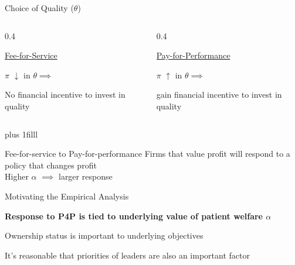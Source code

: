 \documentclass[notes,11pt, aspectratio=169]{beamer}
\newcommand{\btVFill}{\vskip0pt plus 1filll}
\newenvironment{wideitemize}{\itemize\addtolength{\itemsep}{10pt}}{\enditemize}
\begin{document}
\begin{frame}{Choice of Quality ($\theta$)}\label{choiceofquality}

\large
\vspace{5mm}

    \begin{columns}
    \begin{column}{0.4\textwidth}
    \begin{center}
        \underline{Fee-for-Service}

        \vspace{3mm}

            $\pi$ $\downarrow$ in $\theta \implies$

            \vspace{3mm}

            No financial incentive to invest in quality
    \end{center}
    \end{column}\pause
    \begin{column}{0.4\textwidth}  %
    \begin{center}
        \underline{Pay-for-Performance}

        \vspace{3mm}


            $\pi$ $\uparrow$ in $\theta \implies$

            \vspace{3mm}

            gain financial incentive to invest in quality
    \end{center}
    \end{column}
\end{columns}

\btVFill\pause

\begin{block}{\Large Fee-for-service to Pay-for-performance}
    \centering
    \vspace{1mm}
    Firms that value profit will respond to a policy that changes profit \\
    Higher $\alpha$ $\implies$ larger response

    \vspace{3mm}
\end{block}

\hyperlink{choiceofqualityapp}{}
\end{frame}

\begin{frame}{Motivating the Empirical Analysis}

        \textbf{Response to P4P is tied to underlying value of patient welfare $\alpha$}
        \vspace{3mm}
        \begin{wideitemize}
            \item Ownership status is important to underlying objectives
            \item It's reasonable that priorities of leaders are also an important factor
        \end{wideitemize}

\end{frame}
\end{document}
